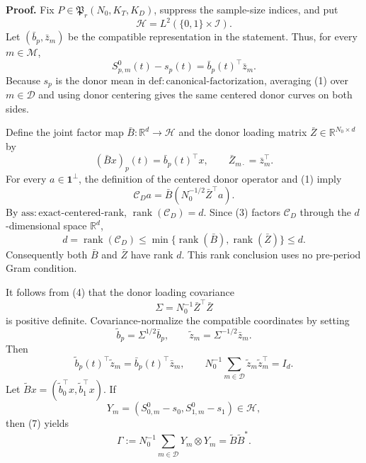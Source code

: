 \textbf{Proof.}
Fix \(P\in\mathfrak P_r(N_0,K_T,K_D)\), suppress the sample-size indices, and put
\[
 \mathcal H=L^2(\{0,1\}\times\mathcal I).
\]
Let \((\bar b_p,\bar z_m)\) be the compatible representation in the statement.  Thus, for every \(m\in\mathcal M\),
\[
 S^0_{p,m}(t)-s_p(t)=\bar b_p(t)^\top\bar z_m. \tag{1}
\]
Because \(s_p\) is the donor mean in \(\mathrm{def:canonical\mbox{-}factorization}\), averaging (1) over \(m\in\mathcal D\) and using donor centering gives the same centered donor curves on both sides.

Define the joint factor map \(\bar B:\mathbb R^d\to\mathcal H\) and the donor loading matrix \(\bar Z\in\mathbb R^{N_0\times d}\) by
\[
 (\bar Bx)_p(t)=\bar b_p(t)^\top x,
 \qquad
 \bar Z_{m\cdot}=\bar z_m^\top. \tag{2}
\]
For every \(a\in\mathbf 1^\perp\), the definition of the centered donor operator and (1) imply
\[
 \mathcal C_Da
 =\bar B\!\left(N_0^{-1/2}\bar Z^\top a\right). \tag{3}
\]
By \(\mathrm{ass:exact\mbox{-}centered\mbox{-}rank}\), \(\operatorname{rank}(\mathcal C_D)=d\).  Since (3) factors \(\mathcal C_D\) through the \(d\)-dimensional space \(\mathbb R^d\),
\[
 d=\operatorname{rank}(\mathcal C_D)
 \leq \min\{\operatorname{rank}(\bar B),\operatorname{rank}(\bar Z)\}
 \leq d. \tag{4}
\]
Consequently both \(\bar B\) and \(\bar Z\) have rank \(d\).  This rank conclusion uses no pre-period Gram condition.

It follows from (4) that the donor loading covariance
\[
 \Sigma=N_0^{-1}\bar Z^\top\bar Z \tag{5}
\]
is positive definite.  Covariance-normalize the compatible coordinates by setting
\[
 \widetilde b_p=\Sigma^{1/2}\bar b_p,
 \qquad
 \widetilde z_m=\Sigma^{-1/2}\bar z_m. \tag{6}
\]
Then
\[
 \widetilde b_p(t)^\top\widetilde z_m
 =\bar b_p(t)^\top\bar z_m,
 \qquad
 N_0^{-1}\sum_{m\in\mathcal D}\widetilde z_m\widetilde z_m^\top=I_d. \tag{7}
\]
Let \(\widetilde Bx=(\widetilde b_0^\top x,\widetilde b_1^\top x)\).  If
\[
 Y_m=(S^0_{0,m}-s_0,S^0_{1,m}-s_1)\in\mathcal H,
\]
then (7) yields
\[
 \Gamma:=N_0^{-1}\sum_{m\in\mathcal D}Y_m\otimes Y_m
 =\widetilde B\widetilde B^*. \tag{8}
\]

